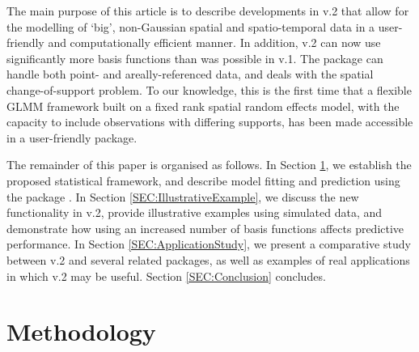 \documentclass[article]{jss}
\begin{document}

 The main purpose of this article is to describe developments in  v.2 that allow for the modelling of `big', non-Gaussian spatial and spatio-temporal data in a user-friendly and computationally efficient manner. 
 In addition,  v.2 can now use significantly more basis functions than was possible in  v.1. 
The package can handle both point- and areally-referenced data, and deals with the spatial change-of-support problem. 
To our knowledge, this is the first time that a flexible GLMM framework built on a fixed rank spatial random effects model, with the capacity to include observations with differing supports, has been made accessible in a user-friendly package. 


The remainder of this paper is organised as follows. 
In Section \ref{SEC:Methodology}, we establish the proposed statistical framework, and describe model fitting and prediction using the  package  \citep{Kristensen_2016_TMB}. 
In Section \ref{SEC:IllustrativeExample}, we discuss the new functionality in  v.2, provide illustrative examples using simulated data, %
 and demonstrate how using an increased number of basis functions affects predictive performance. %
In Section \ref{SEC:ApplicationStudy}, we present a comparative study between  v.2 and several related packages, as well as examples of real applications in which  v.2 may be useful.  
Section \ref{SEC:Conclusion} concludes.%

\section{Methodology}\label{SEC:Methodology}
\end{document}
